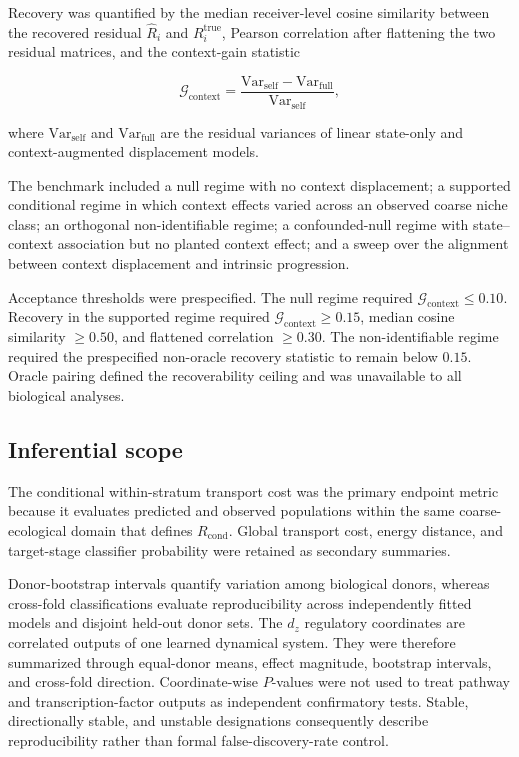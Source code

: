 Recovery was quantified by the median receiver-level cosine similarity between
the recovered residual \(\widehat{R}_i\) and
\(R_i^{\mathrm{true}}\), Pearson correlation after flattening the two residual
matrices, and the context-gain statistic

\begin{equation}
\mathcal{G}_{\mathrm{context}}
=
\frac{
\mathrm{Var}_{\mathrm{self}}
-
\mathrm{Var}_{\mathrm{full}}
}{
\mathrm{Var}_{\mathrm{self}}
},
\label{eq:methods-synthetic-context-gain}
\end{equation}

where \(\mathrm{Var}_{\mathrm{self}}\) and \(\mathrm{Var}_{\mathrm{full}}\) are the residual
variances of linear state-only and context-augmented displacement models.

The benchmark included a null regime with no context displacement; a supported
conditional regime in which context effects varied across an observed coarse
niche class; an orthogonal non-identifiable regime; a confounded-null regime
with state--context association but no planted context effect; and a sweep over
the alignment between context displacement and intrinsic progression.

Acceptance thresholds were prespecified. The null regime required
\(\mathcal{G}_{\mathrm{context}}\leq0.10\). Recovery in the supported regime required
\(\mathcal{G}_{\mathrm{context}}\geq0.15\), median cosine similarity
\(\geq0.50\), and flattened correlation \(\geq0.30\). The non-identifiable
regime required the prespecified non-oracle recovery statistic to remain below
\(0.15\). Oracle pairing defined the recoverability ceiling and was unavailable
to all biological analyses.

\subsection{Inferential scope}
\label{sec:methods-evaluation-scope}

The conditional within-stratum transport cost was the primary endpoint metric
because it evaluates predicted and observed populations within the same
coarse-ecological domain that defines \(R_{\mathrm{cond}}\). Global transport
cost, energy distance, and target-stage classifier probability were retained as
secondary summaries.

Donor-bootstrap intervals quantify variation among biological donors, whereas
cross-fold classifications evaluate reproducibility across independently fitted
models and disjoint held-out donor sets. The \(d_z\) regulatory coordinates are
correlated outputs of one learned dynamical system. They were therefore
summarized through equal-donor means, effect magnitude, bootstrap intervals, and
cross-fold direction. Coordinate-wise \(P\)-values were not used to treat
pathway and transcription-factor outputs as independent confirmatory tests.
Stable, directionally stable, and unstable designations consequently describe
reproducibility rather than formal false-discovery-rate control.

